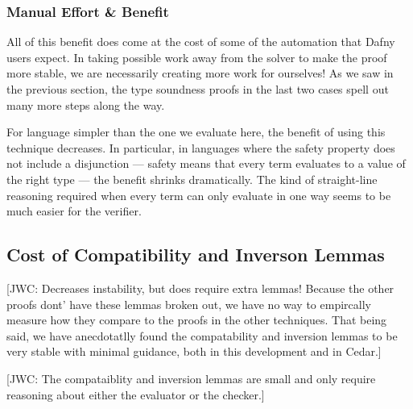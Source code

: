 \documentclass[sigplan,review,screen,anonymous]{acmart}
\newcommand{\comm}[3]{\textcolor{#1}{[#2: #3]}}
\newcommand{\jwc}[1]{\comm{dkgreen}{JWC}{#1}}
\begin{document}
\subsubsection*{Manual Effort \& Benefit}
All of this benefit does come at the cost of some of the automation that Dafny
users expect. In taking possible work away from the solver to make the proof
more stable, we are necessarily creating more work for ourselves!  As we saw in
the previous section, the type soundness proofs in the last two cases spell out
many more steps along the way.

For language simpler than the one we evaluate here, the benefit of using this technique decreases. In particular, in languages
where the safety property does not include a disjunction --- safety means that every term evaluates to a value of the right type ---
the benefit shrinks dramatically. The kind of straight-line reasoning required when every term can only evaluate in one way seems to be
much easier for the verifier.

\subsection*{Cost of Compatibility and Inverson Lemmas}
\jwc{Decreases instability, but does require extra lemmas! Because the other proofs dont' have these lemmas broken out, we have no way to empircally measure how they compare to the proofs in the other techniques. That being said, we have anecdotatlly found the compatability and inversion lemmas to be very stable with minimal guidance, both in this development and in Cedar.}

\jwc{The compataiblity and inversion lemmas are small and only require reasoning about either the evaluator or the checker.}






\end{document}
